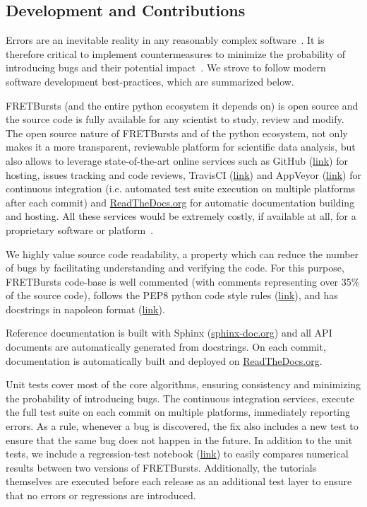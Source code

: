 \documentclass[10pt,letterpaper]{article}
\begin{document}
\subsection{Development and Contributions}
\label{sec:dev}
Errors are an inevitable reality in any reasonably complex software~\cite{Merali_2010,Soergel_2015}. It is
therefore critical to implement countermeasures to
minimize the probability of introducing bugs and their potential impact~\cite{Prli__2012, Wilson_2014}.
We strove to follow modern software development best-practices, which are summarized
below.

FRETBursts (and the entire python ecosystem it depends on) is open source
and the source code is fully available for any scientist to study,
review and modify.
The open source nature of FRETBursts and of the python ecosystem,
not only makes it a more transparent, reviewable platform
for scientific data analysis, but also allows
to leverage state-of-the-art online services such as GitHub (\href{http://https://github.com}{link}) for hosting,
issues tracking and code reviews, TravisCI
(\href{https://travis-ci.org}{link}) and AppVeyor (\href{http://www.appveyor.com/}{link}) for continuous integration
(i.e. automated test suite execution on multiple platforms after each commit)
and \href{https://readthedocs.org/}{ReadTheDocs.org} for automatic documentation building and hosting.
All these services would be extremely costly, if available at all,
for a proprietary software or platform~\cite{Freeman_2015}.

We highly value source code readability, a property which can
reduce the number of bugs by facilitating understanding and verifying the code.
For this purpose, FRETBursts code-base is well commented (with comments representing over 35\%
of the source code),
follows the PEP8 python code style rules (\href{https://www.python.org/dev/peps/pep-0008/}{link}),
and has docstrings in napoleon format (\href{http://sphinxcontrib-napoleon.readthedocs.org/}{link}).

Reference documentation is built with Sphinx (\href{http://sphinx-doc.org/}{sphinx-doc.org})
and all API documents are automatically generated from docstrings.
On each commit, documentation is automatically built and deployed on
\href{https://readthedocs.org/}{ReadTheDocs.org}.

Unit tests cover most of the core algorithms, ensuring consistency and
minimizing the probability of introducing bugs.
The continuous integration services, execute the full test suite 
on each commit on multiple platforms, immediately reporting errors.
As a rule, whenever a bug is discovered, the  fix also includes a new test
to ensure that the same bug does not happen in the future.
In addition to the unit tests, we include a regression-test notebook
(\href{https://github.com/tritemio/FRETBursts/blob/master/notebooks/dev/tests/FRETBursts%20-%20Regression%20tests.ipynb}{link})
to easily compares numerical results between two versions of FRETBursts.
Additionally, the tutorials themselves are executed before each release as
an additional test layer to ensure that no errors or regressions are introduced.
\end{document}

